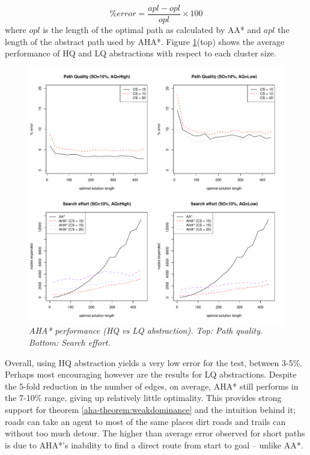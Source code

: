 $$ \%error = \frac{apl - opl}{opl} \times 100 $$ where $opl$ is the length of the optimal path as calculated by AA* and $apl$ the length of the abstract path used by AHA*.
Figure \ref{aha-fig:allgraphs}(top) shows the average performance of HQ and LQ abstractions with respect to each cluster size. 
\begin{figure}[htbp]
       \caption{\small{\emph{AHA* performance (HQ vs LQ abstraction). Top: Path quality. Bottom: Search effort. }}}
       \begin{center}
                       \includegraphics[scale=0.35]{diagrams/allgraphs.pdf}
       \end{center}
       \label{aha-fig:allgraphs}
\end{figure}
Overall, using HQ abstraction yields a very low error for the test, between 3-5\%. 
Perhaps most encouraging however are the results for LQ abstractions. 
Despite the 5-fold reduction in the number of edges, on average, AHA* still performs in the 7-10\% range, giving up relatively little optimality. 
This provides strong support for theorem \ref{aha-theorem:weakdominance} and the intuition behind it; roads can take an agent to most of the same places dirt roads and trails can without too much detour.
The higher than average error observed for short paths is due to AHA*'s inability to find a direct route from start to goal -- unlike AA*.
